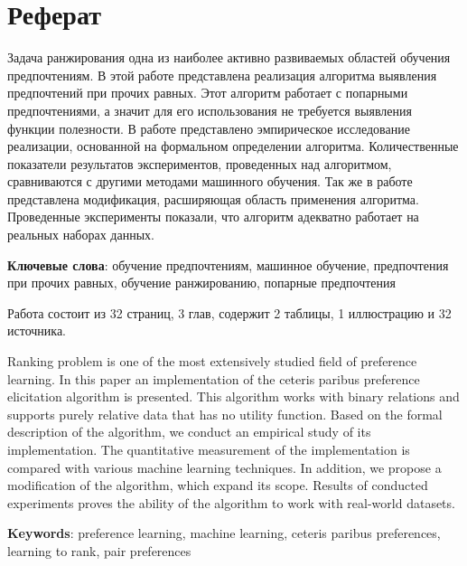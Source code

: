 \chapter*{Реферат}

Задача ранжирования одна из наиболее активно развиваемых областей обучения предпочтениям. В этой работе представлена реализация алгоритма выявления предпочтений при прочих равных. Этот алгоритм работает с попарными предпочтениями, а значит для его использования не требуется выявления функции полезности. В работе представлено эмпирическое исследование реализации, основанной на формальном определении алгоритма. Количественные показатели результатов экспериментов, проведенных над алгоритмом, сравниваются с другими методами машинного обучения. Так же в работе представлена модификация, расширяющая область применения алгоритма. Проведенные эксперименты показали, что алгоритм адекватно работает на реальных наборах данных.

\textbf{Ключевые слова}: обучение предпочтениям, машинное обучение, предпочтения при прочих равных, обучение ранжированию, попарные предпочтения 

\vspace{2em}

Работа состоит из 32 страниц, 3 глав, содержит 2 таблицы, 1 иллюстрацию и 32 источника. 

\newpage


Ranking problem is one of the most extensively studied field of preference learning. In this paper an implementation of the ceteris paribus preference elicitation algorithm is presented. This algorithm works with binary relations and supports purely relative data that has no utility function. Based on the formal description of the algorithm, we conduct an empirical study of its implementation. The quantitative measurement of the implementation is compared with various machine learning techniques. In addition, we propose a modification of the algorithm, which expand its scope. Results of conducted experiments proves the ability of the algorithm to work with real-world datasets.

\textbf{Keywords}: preference learning, machine learning, ceteris paribus preferences, learning to rank, pair preferences